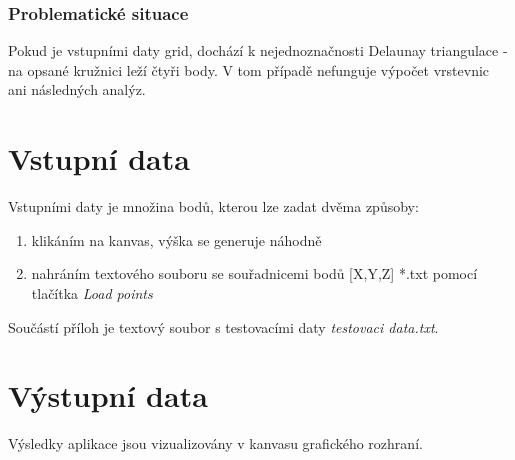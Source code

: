 \documentclass[a4paper, 12pt]{article}
\begin{document}
\subsubsection{Problematické situace}
Pokud je vstupními daty grid, dochází k nejednoznačnosti Delaunay triangulace - na opsané kružnici leží čtyři body. V tom případě nefunguje výpočet vrstevnic ani následných analýz.



\clearpage


\section{Vstupní data}

Vstupními daty je množina bodů, kterou lze zadat dvěma způsoby:\\
\begin{enumerate}
\item klikáním na kanvas, výška se generuje náhodně
\item nahráním textového souboru se souřadnicemi bodů [X,Y,Z] *.txt pomocí tlačítka \textit{Load points}
\end{enumerate}
Součástí příloh je textový soubor s testovacími daty \textit{testovaci data.txt}.

\section{Výstupní data}
Výsledky aplikace jsou vizualizovány v kanvasu grafického rozhraní.

\end{document}
